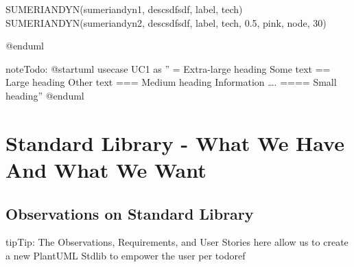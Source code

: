 \documentclass[letterpaper,10pt,english]{sphinxmanual}
\begin{document}
\begin{sphinxVerbatim}[commandchars=\\\{\},numbers=left,firstnumber=1,stepnumber=1]
\PYGZdl{}SUMERIAN\PYGZus{}DYN(\PYGZdq{}sumerian\PYGZus{}dyn\PYGZus{}1\PYGZdq{}, \PYGZdq{}descsdfsdf\PYGZdq{}, \PYGZdq{}label\PYGZdq{}, \PYGZdq{}tech\PYGZdq{})
\PYGZdl{}SUMERIAN\PYGZus{}DYN(\PYGZdq{}sumerian\PYGZus{}dyn\PYGZus{}2\PYGZdq{}, \PYGZdq{}descsdfsdf\PYGZdq{}, \PYGZdq{}label\PYGZdq{}, \PYGZdq{}tech\PYGZdq{}, 0.5, \PYGZdq{}pink\PYGZdq{}, \PYGZdq{}node\PYGZdq{}, 30)



@enduml
\end{sphinxVerbatim}
\sphinxresetverbatimhllines

\begin{sphinxadmonition}{note}{\label{\detokenize{Stdlib/StandardisingStdLib:id2}}Todo:}
@startuml
usecase UC1 as ”
= Extra-large heading
Some text
== Large heading
Other text
=== Medium heading
Information
….
==== Small heading”
@enduml
\end{sphinxadmonition}


\section{Standard Library - What We Have And What We Want}
\label{\detokenize{Stdlib/stdlibRequirements:standard-library-what-we-have-and-what-we-want}}\label{\detokenize{Stdlib/stdlibRequirements:stdlibreqs-label}}\label{\detokenize{Stdlib/stdlibRequirements::doc}}

\subsection{Observations on Standard Library}
\label{\detokenize{Stdlib/stdlibRequirements:observations-on-standard-library}}
\begin{sphinxadmonition}{tip}{Tip:}
The Observations, Requirements, and User Stories here allow us to create a new
PlantUML Stdlib to empower the user per todoref
\end{sphinxadmonition}
\end{document}
